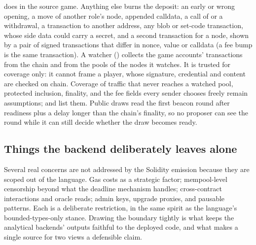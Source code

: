does in the source game.  Anything else burns the deposit: an early or
wrong opening, a move of another role's node, appended calldata, a call
of  or a withdrawal, a transaction to another address, any
blob or set-code transaction, whose side data could carry a secret, and
a second transaction for a node, shown by a pair of signed
transactions that differ in nonce, value or calldata (a fee bump is the
same transaction).  A watcher () collects the game
accounts' transactions from the chain and from the pools of the nodes
it watches.  It is trusted for coverage only: it cannot frame a player,
whose signature, credential and content are checked on chain.
Coverage of traffic that never reaches a watched pool, protected
inclusion, finality, and the fee fields every sender chooses freely
remain assumptions;  and
 list them.
Public draws read the first beacon round after readiness plus a delay
longer than the chain's finality, so no proposer can see the round
while it can still decide whether the draw becomes ready.

\subsection{Things the backend deliberately leaves alone}

Several real concerns are not addressed by the Solidity emission
because they are scoped out of the language.  Gas costs as a
strategic factor; mempool-level censorship beyond what the deadline
mechanism handles; cross-contract interactions and oracle reads;
admin keys, upgrade proxies, and pausable patterns.  Each is a deliberate restriction, in the same spirit as the
language's bounded-types-only stance.  Drawing the boundary
tightly is what keeps the analytical backends' outputs faithful
to the deployed code, and what makes a single source for two
views a defensible claim.
